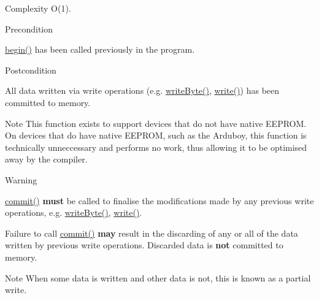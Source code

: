 \begin{DoxyParagraph}{Complexity}
{\ttfamily O(1)}.
\end{DoxyParagraph}
\begin{DoxyPrecond}{Precondition}
\begin{DoxyItemize}
\item {\ttfamily \mbox{\hyperlink{classArduboy2EEPROM_a4d482ef8e8204c56a0feba68791bc0c8}{begin()}}} has been called previously in the program.\end{DoxyItemize}

\end{DoxyPrecond}
\begin{DoxyPostcond}{Postcondition}
\begin{DoxyItemize}
\item All data written via write operations (e.\+g. {\ttfamily \mbox{\hyperlink{classArduboy2EEPROM_a104991fb0112413980ee163aaa14d891}{write\+Byte()}}}, {\ttfamily \mbox{\hyperlink{classArduboy2EEPROM_abf7be1f27f4815de59257210dac8c9eb}{write()}}}) has been committed to memory.\end{DoxyItemize}

\end{DoxyPostcond}
\begin{DoxyNote}{Note}
This function exists to support devices that do not have native E\+E\+P\+R\+OM. On devices that do have native E\+E\+P\+R\+OM, such as the Arduboy, this function is technically unneccessary and performs no work, thus allowing it to be optimised away by the compiler.
\end{DoxyNote}
\begin{DoxyWarning}{Warning}
\begin{DoxyItemize}
\item {\ttfamily \mbox{\hyperlink{classArduboy2EEPROM_a3804f82ad79284baa047fa3572ea1db5}{commit()}}} {\bfseries{must}} be called to finalise the modifications made by any previous write operations, e.\+g. {\ttfamily \mbox{\hyperlink{classArduboy2EEPROM_a104991fb0112413980ee163aaa14d891}{write\+Byte()}}}, {\ttfamily \mbox{\hyperlink{classArduboy2EEPROM_abf7be1f27f4815de59257210dac8c9eb}{write()}}}. \item Failure to call {\ttfamily \mbox{\hyperlink{classArduboy2EEPROM_a3804f82ad79284baa047fa3572ea1db5}{commit()}}} {\bfseries{may}} result in the discarding of any or all of the data written by previous write operations. Discarded data is {\bfseries{not}} committed to memory.\end{DoxyItemize}

\end{DoxyWarning}
\begin{DoxyNote}{Note}
When some data is written and other data is not, this is known as a \textquotesingle{}partial write\textquotesingle{}. 
\end{DoxyNote}


